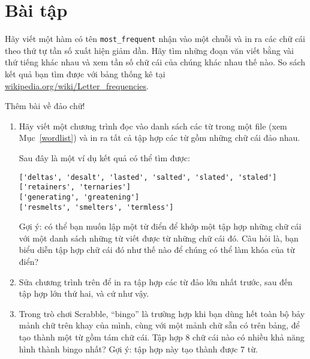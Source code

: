 \documentclass[11pt]{book}
\begin{document}
\section{Bài tập}

\begin{ex}
Hãy viết một hàm có tên \verb"most_frequent" nhận vào một chuỗi
và in ra các chữ cái theo thứ tự tần số xuất hiện giảm dần. Hãy tìm
những đoạn văn viết bằng vài thứ tiếng khác nhau và xem tần số chữ cái
của chúng khác nhau thế nào. So sách kết quả bạn tìm được với bảng
thống kê tại \url{wikipedia.org/wiki/Letter_frequencies}.


\end{ex}


\begin{ex}
\label{anagrams}


Thêm bài về đảo chữ!

\begin{enumerate}

\item Hãy viết một chương trình đọc vào danh sách các từ trong 
một file (xem Mục~\ref{wordlist}) và in ra tất cả tập hợp
các từ gồm những chữ cái đảo nhau.

Sau đây là một ví dụ kết quả có thể tìm được:

\beforeverb
\begin{verbatim}
['deltas', 'desalt', 'lasted', 'salted', 'slated', 'staled']
['retainers', 'ternaries']
['generating', 'greatening']
['resmelts', 'smelters', 'termless']
\end{verbatim}
\afterverb
%
Gợi ý: có thể bạn muốn lập một từ điển để khớp một tập hợp
những chữ cái với một danh sách những từ viết được từ những chữ cái
đó. Câu hỏi là, bạn biểu diễn tập hợp chữ cái đó như thế nào để
chúng có thể làm khóa của từ điển?

\item Sửa chương trình trên để in ra tập hợp các từ đảo lớn nhất trước,
sau đến tập hợp lớn thứ hai, và cứ như vậy.


\item Trong trò chơi Scrabble, ``bingo'' là trường hợp khi bạn dùng hết
toàn bộ bảy mảnh chữ trên khay của mình, cùng với một mảnh chữ sẵn có trên
bảng, để tạo thành một từ gồm tám chữ cái. Tập hợp 8 chữ cái nào có nhiều
khả năng hình thành bingo nhất?
Gợi ý: tập hợp này tạo thành được 7 từ.


\end{enumerate}
\end{ex}
\end{document}
